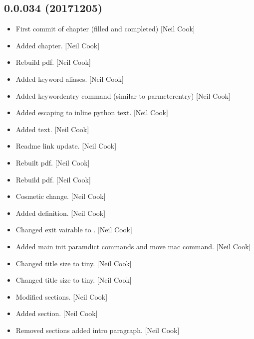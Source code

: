\documentclass[a4paper,10pt,english]{report}
\begin{document}
\subsection{0.0.034 (2017\sphinxhyphen{}12\sphinxhyphen{}05)}
\label{\detokenize{misc/changelog:id536}}\begin{itemize}
\item {} 
First commit of  chapter (filled and completed) {[}Neil
Cook{]}

\item {} 
Added  chapter. {[}Neil Cook{]}

\item {} 
Rebuild pdf. {[}Neil Cook{]}

\item {} 
Added keyword aliases. {[}Neil Cook{]}

\item {} 
Added keywordentry command (similar to parmeterentry) {[}Neil Cook{]}

\item {} 
Added escaping to inline python text. {[}Neil Cook{]}

\item {} 
Added text. {[}Neil Cook{]}

\item {} 
Readme link update. {[}Neil Cook{]}

\item {} 
Rebuilt pdf. {[}Neil Cook{]}

\item {} 
Rebuild pdf. {[}Neil Cook{]}

\item {} 
Cosmetic change. {[}Neil Cook{]}

\item {} 
Added  definition. {[}Neil Cook{]}

\item {} 
Changed exit vairable to . {[}Neil Cook{]}

\item {} 
Added main init paramdict commands and move mac command. {[}Neil Cook{]}

\item {} 
Changed title size to tiny. {[}Neil Cook{]}

\item {} 
Changed title size to tiny. {[}Neil Cook{]}

\item {} 
Modified sections. {[}Neil Cook{]}

\item {} 
Added section. {[}Neil Cook{]}

\item {} 
Removed sections added intro paragraph. {[}Neil Cook{]}

\end{itemize}
\end{document}
